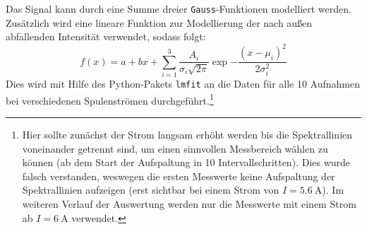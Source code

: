 \begin{figure}[ht]
\end{figure}

\noindent Das Signal kann durch eine Summe dreier \texttt{Gauss}-Funktionen modelliert werden. Zusätzlich wird eine lineare Funktion zur Modellierung der nach außen abfallenden Intensität verwendet, sodass folgt:
\begin{equation*}
    f(x) = a + bx + \sum^{3}_{i=1} \frac{A_i}{\sigma_i\sqrt{2\pi}}\exp{-\frac{(x-\mu_i)^2}{2\sigma_i^2}}
\end{equation*}
Dies wird mit Hilfe des Python-Pakets \texttt{lmfit} an die Daten für alle 10 Aufnahmen bei verschiedenen Spulenströmen durchgeführt.\footnote{Hier sollte zunächst der Strom langsam erhöht werden bis die Spektrallinien voneinander getrennt sind, um einen sinnvollen Messbereich wählen zu können (ab dem Start der Aufspaltung in 10 Intervallschritten). Dies wurde falsch verstanden, weswegen die ersten Messwerte keine Aufspaltung der Spektrallinien aufzeigen (erst sichtbar bei einem Strom von $I=\SI{5,6}{\ampere}$). Im weiteren Verlauf der Auswertung werden nur die Messwerte mit einem Strom ab $I = \SI{6}{\ampere}$ verwendet.}